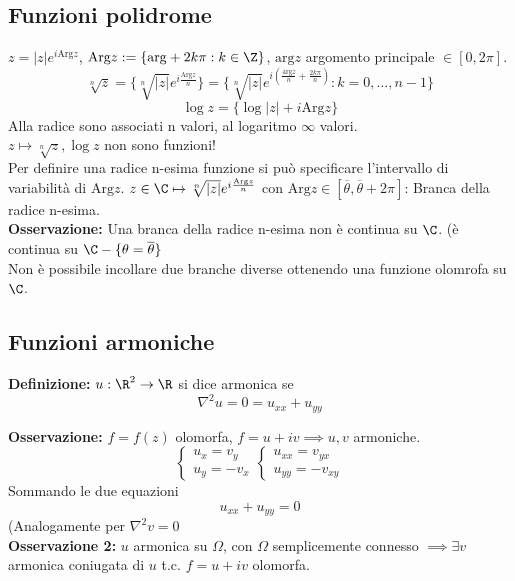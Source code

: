 \subsection{Funzioni polidrome}
$z=|z|e^{i\text{Arg}z}$, $\text{Arg}z:=\{\text{arg}+2k\pi:k\in\Z\} $, $\text{arg}z$ argomento principale $\in[0,2\pi]$.
\[\sqrt[n]{z}=\{\sqrt[n]{|z|}e^{i \frac{\text{Arg}z}{n}} \}=\{\sqrt[n]{|z|}e^{i( \frac{\text{arg}z}{n}+ \frac{2k\pi}{n})}:k=0,\ldots,n-1 \} \]
\[\log z=\{\log |z|+i\text{Arg}z\}\]
Alla radice sono associati n valori, al logaritmo $\infty$ valori.
\\$z \mapsto \sqrt[n]{z},\log z$ non sono funzioni!
\\Per definire una radice n-esima funzione si può specificare l'intervallo di variabilità di $\text{Arg}z$.
$z\in\C\mapsto \sqrt[n]{|z|} e^{i \frac{\text{Arg}z}{n}}$ con $\text{Arg}z\in[\overline \theta,\overline\theta+2\pi]$: Branca della radice n-esima.
\\\textbf{Osservazione:} Una branca della radice n-esima non è continua su $\C$. (è continua su $\C-\{\theta=\overline\theta\}$
\\Non è possibile incollare due branche diverse ottenendo una funzione olomrofa su $\C$.
\subsection{Funzioni armoniche}
\begin{tcolorbox}
	\textbf{Definizione:} $u:\R^2\to \R$ si dice armonica se 
	\[\nabla^2 u=0=u_{x x}+u_{y y}\]
\end{tcolorbox}
\textbf{Osservazione:} $f=f(z)$ olomorfa, $f=u+iv\implies u,v$ armoniche.
\[\begin{cases}
	u_x=v_y
	\\u_y=-v_x
\end{cases}
\begin{cases}
	u_{x x}=v_{y x}\\
	u_{y y}=-v_{xy}
\end{cases}
\]
Sommando le due equazioni
\[u_{x x}+u_{y y}=0\]
(Analogamente per $\nabla ^2 v=0$
\\\textbf{Osservazione 2:} $u$ armonica su $\Omega$, con $\Omega$ semplicemente connesso $\implies\exists v$ armonica coniugata di $u$ t.c. $f=u+iv$ olomorfa.

